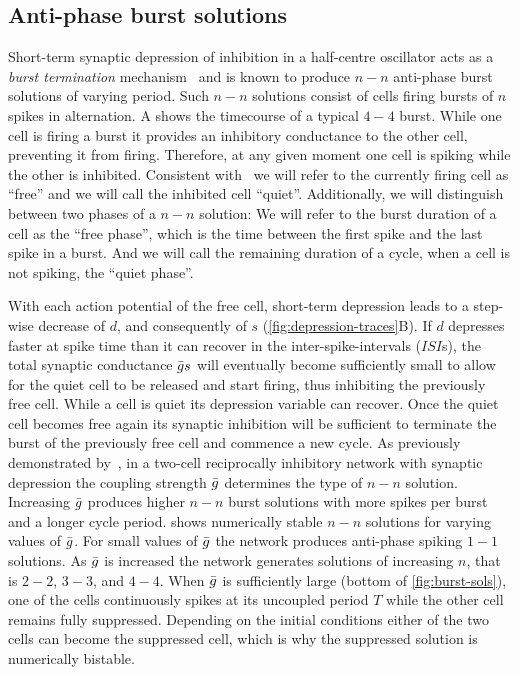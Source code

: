 \documentclass[../manuscript.tex]{subfiles}
\begin{document}
\subsection{Anti-phase burst solutions}
Short-term synaptic depression of inhibition in a half-centre oscillator acts as a \emph{burst termination} mechanism~\citep{brown1911} and is known to produce $n-n$ anti-phase burst solutions of varying period.
Such $n-n$ solutions consist of cells firing bursts of $n$ spikes in alternation.
A shows the timecourse of a typical $4-4$ burst.
While one cell is firing a burst it provides an inhibitory conductance to the other cell,  preventing it from firing.
Therefore, at any given moment one cell is spiking while the other is inhibited.
Consistent with~\citet{bose2011} we will refer to the currently firing cell as ``free'' and we will call the inhibited cell ``quiet''.
Additionally, we will distinguish between two phases of a $n-n$ solution:
We will refer to the burst duration of a cell as the ``free phase'', which is the time between the first spike and the last spike in a burst. And we will call the remaining duration of a cycle, when a cell is not spiking, the ``quiet phase''.

With each action potential of the free cell, short-term depression leads to a step-wise decrease of $d$, and consequently of $s$ (\cref{fig:depression-traces}B).
If $d$ depresses faster at spike time than it can recover in the inter-spike-intervals ($ISI$s), the total synaptic conductance $\bar g s$ will eventually become sufficiently small to allow for the quiet cell to be released and start firing, thus inhibiting the previously free cell.
While a cell is quiet its depression variable can recover.
Once the quiet cell becomes free again its synaptic inhibition will be sufficient to terminate the burst of the previously free cell and commence a new cycle.
As previously demonstrated by~\citet{bose2011}, in a two-cell reciprocally inhibitory network with synaptic depression the coupling strength $\bar g$ determines the type of $n-n$ solution.
Increasing $\bar g$ produces higher $n-n$ burst solutions with more spikes per burst and a longer cycle period.
 shows numerically stable $n-n$ solutions for varying values of $\bar g$.
For small values of $\bar g$ the network produces anti-phase spiking $1-1$ solutions.
As $\bar g$ is increased the network generates solutions of increasing $n$, that is $2-2$, $3-3$, and $4-4$.
When $\bar g$ is sufficiently large (bottom of \cref{fig:burst-sols}), one of the cells continuously spikes at its uncoupled period $T$ while the other cell remains fully suppressed.
Depending on the initial conditions either of the two cells can become the suppressed cell, which is why the suppressed solution is numerically bistable.
\end{document}
